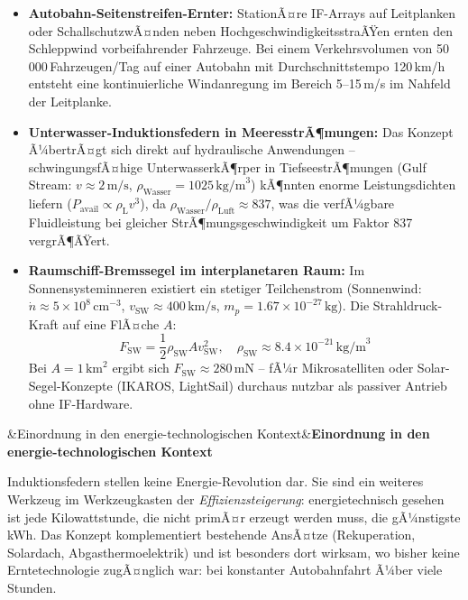 ﻿\documentclass[12pt, a4paper]{report}
\newenvironment{hinweis}[1][]{%
  \begin{hinweisframe}\sloppy%
  \ifx&#1&\else\textbf{#1}\par\smallskip\fi}{\end{hinweisframe}}
\theoremstyle{definition}
\theoremstyle{remark}
\newcommand{\rhoL}{\rho_{\text{L}}}
\begin{document}
\begin{itemize}
  \item \textbf{Autobahn-Seitenstreifen-Ernter:} StationÃ¤re IF-Arrays auf
        Leitplanken oder SchallschutzwÃ¤nden neben HochgeschwindigkeitsstraÃŸen
        ernten den Schlepp\-wind vorbeifahrender Fahrzeuge. Bei einem
        Verkehrsvolumen von 50\,000\,Fahr\-zeugen/Tag auf einer Autobahn
        mit Durchschnitts\-tempo 120\,km/h entsteht eine kontinuierliche
        Windanregung im Bereich 5--15\,m/s im Nahfeld der Leitplanke.

  \item \textbf{Unterwasser-Induktionsfedern in MeeresstrÃ¶mungen:} Das
        Konzept Ã¼bertrÃ¤gt sich direkt auf hydraulische Anwendungen --
        schwingungsfÃ¤hige UnterwasserkÃ¶rper in Tiefseest\-rÃ¶mungen
        (Gulf Stream: $v \approx 2\,\text{m/s}$, $\rho_{\text{Wasser}} = 1025\,\text{kg/m}^3$)
        kÃ¶nnten enorme Leistungsdichten liefern ($P_{\text{avail}} \propto \rhoL v^3$),
        da $\rho_{\text{Wasser}}/\rho_{\text{Luft}} \approx 837$, was die
        verfÃ¼gbare Fluidleistung bei gleicher StrÃ¶mungsgeschwindigkeit
        um Faktor 837 vergrÃ¶ÃŸert.

  \item \textbf{Raumschiff-Bremssegel im interplanetaren Raum:}
        Im Sonnensysteminneren existiert ein stetiger Teilchenstrom
        (Sonnenwind: $\dot{n} \approx 5 \times 10^8\,\text{cm}^{-3}$,
        $v_{\text{SW}} \approx 400\,\text{km/s}$, $m_p = 1.67 \times 10^{-27}\,\text{kg}$).
        Die Strahldruck-Kraft auf eine FlÃ¤che $A$:
        \begin{equation}
          F_{\text{SW}} = \frac{1}{2}\rho_{\text{SW}} A v_{\text{SW}}^2,
          \quad \rho_{\text{SW}} \approx 8.4 \times 10^{-21}\,\text{kg/m}^3
        \end{equation}
        Bei $A = 1\,\text{km}^2$ ergibt sich $F_{\text{SW}} \approx 280\,\text{mN}$ --
        fÃ¼r Mikrosatelliten oder Solar-Segel-Konzepte (IKAROS, LightSail)
        durchaus nutzbar als passiver Antrieb ohne IF-Hardware.
\end{itemize}

\begin{hinweis}[Einordnung in den energie-technologischen Kontext]
  Induktionsfedern stellen keine Energie-Revolution dar. Sie sind ein
  weiteres Werkzeug im Werkzeugkasten der \emph{Effizienzsteigerung}:
  energie\-technisch gesehen ist jede Kilowattstunde, die nicht primÃ¤r
  erzeugt werden muss, die gÃ¼nstigste kWh. Das Konzept komplementiert
  bestehende AnsÃ¤tze (Rekuperation, Solardach, Abgasthermoelektrik)
  und ist besonders dort wirksam, wo bisher keine Ernte\-technologie
  zugÃ¤nglich war: bei konstanter Autobahnfahrt Ã¼ber viele Stunden.
\end{hinweis}
\end{document}
